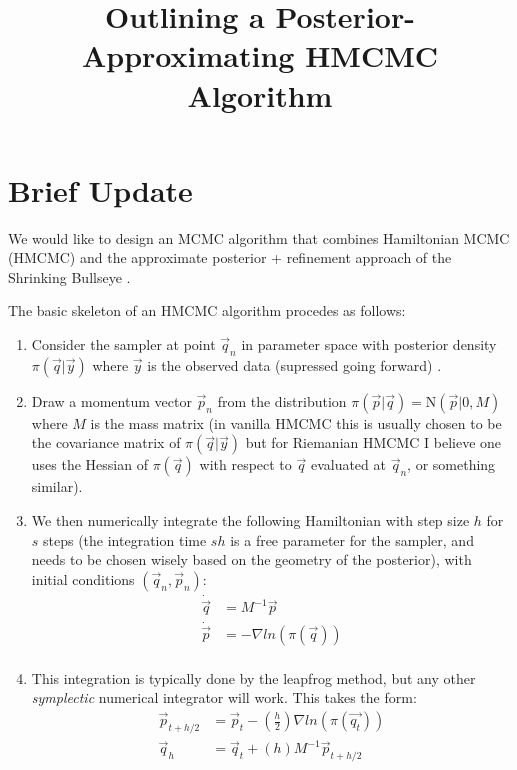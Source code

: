 \documentclass[12pt,a4paper]{article}
\title{Outlining a Posterior-Approximating HMCMC Algorithm}
\begin{document}
\maketitle
\section{Brief Update}
We would like to design an MCMC algorithm that combines Hamiltonian MCMC (HMCMC) \parencite{neal_mcmc_2012,betancourt_geometric_2014,betancourt_conceptual_2017} and the approximate posterior + refinement approach of the Shrinking Bullseye \parencite{conrad_accelerating_2015}. 

The basic skeleton of an HMCMC algorithm procedes as follows:
\begin{enumerate}
\item Consider the sampler at point $\vec{q}_n$ in parameter space with posterior density $\pi(\vec{q} | \vec{y})$ where $\vec{y}$ is the observed data (supressed going forward) .
\item Draw a momentum vector $\vec{p}_n$ from the distribution $\pi(\vec{p} | \vec{q} ) = \text{N}(\vec{p} |0, M)$ where $M$ is the mass matrix (in vanilla HMCMC this is usually chosen to be the covariance matrix of $\pi(\vec{q}|\vec{y})$ but for Riemanian HMCMC I believe one uses the Hessian of $\pi(\vec{q})$ with respect to $\vec{q}$ evaluated at $\vec{q}_n$, or something similar).
\item We then numerically integrate the following Hamiltonian with step size $h$ for $s$ steps (the integration time $sh$ is a free parameter for the sampler, and needs to be chosen wisely based on the geometry of the posterior), with initial conditions $(\vec{q}_n, \vec{p}_n)$:
\begin{equation}
\begin{split}
\dot{\vec{q}} &= M^{-1} \vec{p} \\ 
\dot{\vec{p}} &= - \nabla ln(\pi(\vec{q}))\\
\end{split}
\end{equation}
\item This integration is typically done by the leapfrog method, but any other \textit{symplectic} numerical integrator will work.  This takes the form:
\begin{equation}
\begin{split}
\vec{p}_{t+h/2} &= \vec{p}_t - (\frac{h}{2})  \nabla ln(\pi(\vec{q_t}))\\
\vec{q}_h &= \vec{q}_t + (h)M^{-1} \vec{p}_{t+h/2} \\ 

\end{split}
\end{equation}
\end{enumerate}
\end{document}
